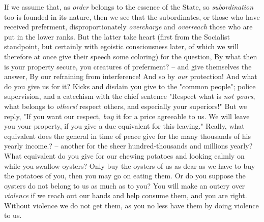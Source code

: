 If we assume that, as \textit{order} belongs to the essence of the State, so 
\textit{subordination} too is founded in its nature, then we see that the 
subordinates, or those who have received preferment, disproportionately 
\textit{overcharge} and \textit{overreach} those who are put in the lower 
ranks. But the latter take heart (first from the Socialist standpoint, but 
certainly with egoistic consciousness later, of which we will therefore at 
once give their speech some coloring) for the question, By what then is your 
property secure, you creatures of preferment? -- and give themselves the 
answer, By our refraining from interference! And so by \textit{our} 
protection! And what do you give us for it? Kicks and disdain you give to the 
"{}common people"{}; police supervision, and a catechism with the chief 
sentence "{}Respect what is \textit{not yours}, what belongs to 
\textit{others!} respect others, and especially your superiors!"{} But we 
reply, "{}If you want our respect, \textit{buy} it for a price agreeable to 
us. We will leave you your property, if you give a due equivalent for this 
leaving."{} Really, what equivalent does the general in time of peace give for 
the many thousands of his yearly income.? -- another for the sheer 
hundred-thousands and millions yearly? What equivalent do you give for our 
chewing potatoes and looking calmly on while you swallow oysters? Only buy the 
oysters of us as dear as we have to buy the potatoes of you, then you may go 
on eating them. Or do you suppose the oysters do not belong to us as much as 
to you? You will make an outcry over \textit{violence} if we reach out our 
hands and help consume them, and you are right. Without violence we do not get 
them, as you no less have them by doing violence to us.

